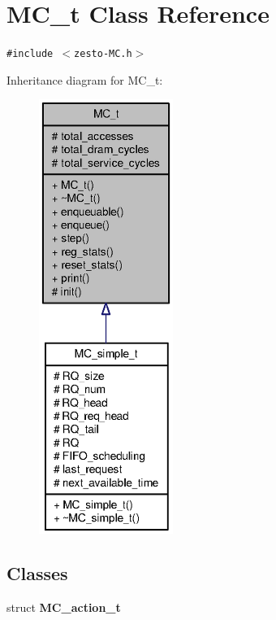 \section{MC\_\-t Class Reference}
\label{classMC__t}
{\tt \#include $<$zesto-MC.h$>$}

Inheritance diagram for MC\_\-t:\nopagebreak
\begin{figure}[H]
\begin{center}
\leavevmode
\includegraphics[height=400pt]{classMC__t__inherit__graph}
\end{center}
\end{figure}
\subsection*{Classes}
\begin{CompactItemize}
\item 
struct {\bf MC\_\-action\_\-t}
\end{CompactItemize}
